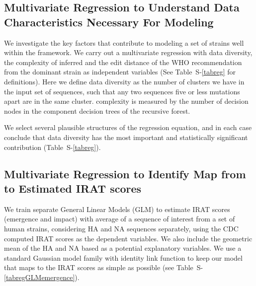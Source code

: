 {\subsection*{Multivariate Regression to Understand Data Characteristics Necessary For \enet Modeling}

We investigate the key factors that contribute to modeling a set of strains well within the \enet framework. We carry out a multivariate regression with data diversity, the complexity of inferred \enet and the edit distance of the WHO recommendation from the dominant strain as independent variables (See \SUPPLEMENTARY Table~S-\ref{tabreg} for definitions). Here we define data diversity as the number of clusters we have in the input set of sequences, such that any two sequences five or less mutations apart are in the same cluster. \enet complexity is measured by the number of decision nodes in the component decision trees of the recursive forest.

We select several plausible structures of the regression equation, and in each case conclude that  data diversity has the most important and statistically significant contribution (\SUPPLEMENTARY Table~S-\ref{tabreg}).

\subsection*{Multivariate Regression to Identify Map from \qdist to Estimated IRAT scores}
We train separate General Linear Models (GLM) to estimate IRAT scores (emergence and impact) with average \qdist of a sequence of interest from a set of human strains, considering HA and NA sequences separately, using the CDC computed IRAT scores as the dependent variables. We also  include the geometric mean of the HA and NA based  as a potential explanatory variables. We use a standard Gaussian model family with identity link function to keep our model that maps   to the IRAT scores as simple as possible (see \SUPPLEMENTARY Table~S-\ref{tabregGLMemergence}).


 



}